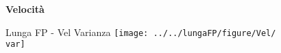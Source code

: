 \documentclass[a4paper, 9pt]{beamer}
\newcommand{\var}{Varianza}
\begin{document}
	\begin{frame}
		\color{blue}\centering\Huge{\textbf{Velocità}}	
	\end{frame}
	
	\begin{frame}{{Lunga FP - Vel \var}}
		\centering\texttt{[image: ../../lungaFP/figure/Vel/\\var]}
	\end{frame}
	
%	
\end{document}
